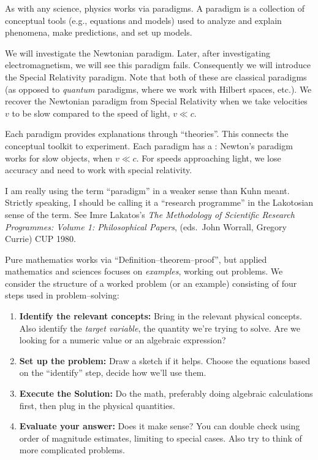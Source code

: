 
 As with any science, physics works via
paradigms. A paradigm is a collection of conceptual tools (e.g.,
equations and models) used to analyze and explain phenomena, make
predictions, and set up models.

We will investigate the Newtonian paradigm. Later, after
investigating electromagnetism, we will see this paradigm
fails. Consequently we will introduce the Special Relativity
paradigm. Note that both of these are classical paradigms (as
opposed to \emph{quantum} paradigms, where we work with Hilbert
spaces, etc.). We recover the Newtonian paradigm from Special
Relativity when we take velocities $v$ to be slow compared to
the speed of light, $v\ll c$.

Each paradigm provides explanations through ``theories''. This
connects the conceptual toolkit to experiment. Each paradigm has
a :
Newton's paradigm works for slow objects, when $v\ll c$. For speeds
approaching light, we lose accuracy and need to work with special
relativity.

\begin{rmk}
I am really using the term ``paradigm'' in a weaker sense than Kuhn meant.
Strictly speaking, I should be calling it a ``research programme'' in the Lakotosian sense of the term.
See Imre Lakatos's \emph{The Methodology of Scientific Research Programmes: Volume 1: Philosophical Papers}, (eds.\ John Worrall, Gregory Currie) CUP 1980.
\end{rmk}

 Pure mathematics works via
``Definition--theorem--proof'', but applied mathematics and
sciences focuses on \emph{examples}, working out problems. We
consider the structure of a worked problem (or an example)
consisting of four steps used in problem--solving:
\begin{enumerate}
\item\textbf{Identify the relevant concepts:} Bring in the
  relevant physical concepts. Also identify the \emph{target variable},
  the quantity we're trying to solve. Are we looking for a
  numeric value or an algebraic expression?
\item\textbf{Set up the problem:} Draw a sketch if it
  helps. Choose the equations based on the ``identify'' step,
  decide how we'll use them.
\item\textbf{Execute the Solution:} Do the math, preferably doing
  algebraic calculations first, then plug in the physical
  quantities.
\item\textbf{Evaluate your answer:} Does it make sense? You can
  double check using order of magnitude estimates, limiting to special
  cases. Also try to think of more complicated problems.
\end{enumerate}

